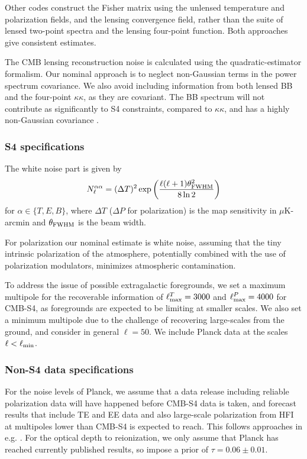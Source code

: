 Other codes construct the Fisher matrix using the unlensed temperature and polarization fields, and the lensing convergence field, rather than the suite of lensed two-point spectra and the lensing four-point function. Both approaches give consistent estimates.

The CMB lensing reconstruction noise is calculated using the \cite{hu02a} quadratic-estimator formalism. Our nominal approach is to neglect non-Gaussian terms in the power spectrum covariance. We also avoid including information from both lensed BB and the four-point $\kappa \kappa$, as they are covariant. The BB spectrum will not contribute as significantly to S4 constraints, compared to $\kappa \kappa$, and has a highly non-Gaussian covariance \cite{BenoitSmithHu1205}. 

\subsubsection{S4 specifications}
The white noise part is given by
%
\begin{equation}
N^{\alpha \alpha}_\ell = (\Delta T)^2 \exp \left( \frac{\ell(\ell + 1) \theta^2_{\rm FWHM}}{8 \ln 2} \right)
\end{equation}
%
for $\alpha \in \{T, E, B\}$, where $\Delta T$ ($\Delta P$ for polarization) is the map sensitivity in $\mu$K-arcmin and $\theta_{\rm FWHM}$ is the beam width. 

For polarization our nominal estimate is white noise, assuming that the tiny intrinsic polarization of the atmosphere, potentially combined with the use of polarization modulators, minimizes atmospheric contamination.

To address the issue of possible extragalactic foregrounds, we set a maximum multipole for the recoverable information of $\ell^T_{\rm max} = 3000$ and $\ell^P_{\rm max} = 4000$ for CMB-S4, as foregrounds are expected to be limiting at smaller scales. We also set a minimum multipole due to the challenge of recovering large-scales from the ground, and consider in general $\ell=50$. We include Planck data at the scales $\ell<\ell_{\rm min}$. 

\subsubsection{Non-S4 data specifications}


For the noise levels of Planck, we assume that a data release including reliable polarization data will have happened before CMB-S4 data is taken, and forecast results that include TE and EE data and also large-scale polarization from HFI at multipoles lower than CMB-S4 is expected to reach. This follows approaches in e.g. \cite{allison15}. For the optical depth to reionization, we only assume that Planck has reached currently published results, so impose a prior of $\tau=0.06\pm0.01$.

